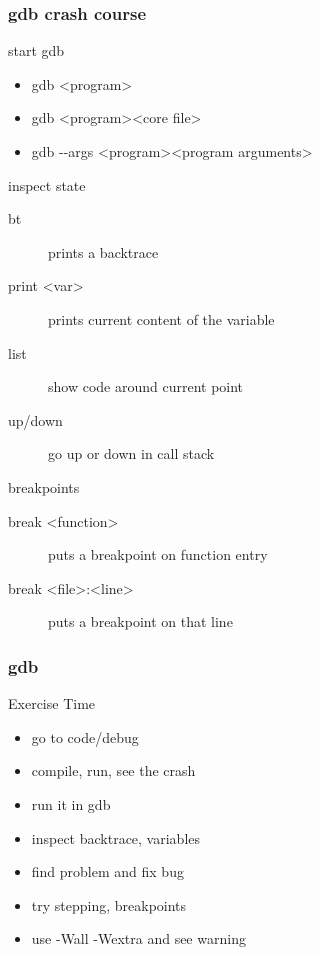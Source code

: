 \begin{frame}[fragile]
  \frametitle{gdb crash course}
  \begin{block}{start gdb}
    \begin{itemize}
    \item gdb \textless{}program\textgreater
    \item gdb \textless{}program\textgreater \textless{}core file\textgreater
    \item gdb -{}-args \textless{}program\textgreater \textless{}program arguments\textgreater
    \end{itemize}
  \end{block}
  \begin{block}{inspect state}
    \begin{description}
    \item[bt] prints a backtrace
    \item[print \textless{}var\textgreater] prints current content of the variable
    \item[list] show code around current point
    \item[up/down] go up or down in call stack
    \end{description}
  \end{block}
  \begin{block}{breakpoints}
    \begin{description}
    \item[break \textless{}function\textgreater] puts a breakpoint on function entry
    \item[break \textless{}file\textgreater:\textless{}line\textgreater] puts a breakpoint on that line
    \end{description}
  \end{block}
\end{frame}

\begin{frame}[fragile]
  \frametitle{gdb}
  \begin{alertblock}{Exercise Time}
    \begin{itemize}
    \item go to code/debug
    \item compile, run, see the crash
    \item run it in gdb
    \item inspect backtrace, variables
    \item find problem and fix bug
    \item try stepping, breakpoints
    \item use -Wall -Wextra and see warning
    \end{itemize}
  \end{alertblock}
\end{frame}

